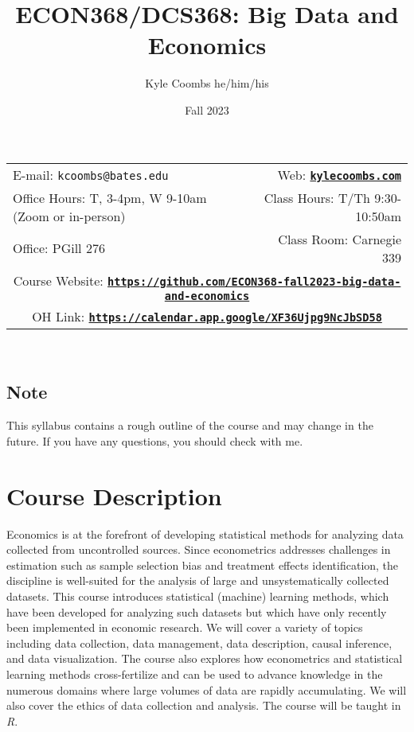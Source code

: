 \documentclass[11pt]{article}
\title{ECON368/DCS368: Big Data and Economics}
\author{Kyle Coombs he/him/his}
\date{Fall 2023}
\begin{document}
\maketitle

\begin{tabular*}{\textwidth}{@{\extracolsep{\fill}}lr}
  
E-mail: \texttt{kcoombs@bates.edu} & Web: \href{kylecoombs.com}{\tt\bf kylecoombs.com} \\

  Office Hours: T, 3-4pm, W 9-10am  (Zoom or in-person)  &  Class Hours: T/Th 9:30-10:50am \\
  Office: PGill 276 & Class Room: Carnegie 339 \\ 
  \multicolumn{2}{c}{Course Website: \href{https://github.com/ECON368-fall2023-big-data-and-economics}{\tt\bf https://github.com/ECON368-fall2023-big-data-and-economics}} \\
  \multicolumn{2}{c}{OH Link: \href{https://calendar.app.google/XF36Ujpg9NcJbSD58
  }{\tt\bf https://calendar.app.google/XF36Ujpg9NcJbSD58}} \\
\hline
\end{tabular*} \\
  
\subsection*{Note}
\label{sec:note}

This syllabus contains a rough outline of the course and may change in the future.  If you have any questions, you should check with me.

\section*{Course Description}
\label{sec:desc}

Economics is at the forefront of developing statistical methods for analyzing data collected from uncontrolled sources. Since econometrics addresses challenges in estimation such as sample selection bias and treatment effects identification, the discipline is well-suited for the analysis of large and unsystematically collected datasets. This course introduces statistical (machine) learning methods, which have been developed for analyzing such datasets but which have only recently been implemented in economic research. We will cover a variety of topics including data collection, data management, data description, causal inference, and data visualization.  The course also explores how econometrics and statistical learning methods cross-fertilize and can be used to advance knowledge in the numerous domains where large volumes of data are rapidly accumulating. We will also cover the ethics of data collection and analysis. The course will be taught in \textit{R}. 
\end{document}
